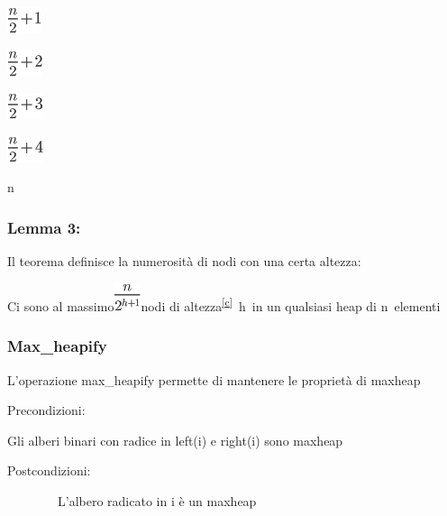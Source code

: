 \documentclass{article}
\begin{document}
\includegraphics{images/image125.png}

\includegraphics{images/image126.png}

\includegraphics{images/image127.png}

\includegraphics{images/image128.png}

{n}

{}

\hypertarget{h.wlc8yrs7inpk}{\subsubsection{\texorpdfstring{{Lemma
3:}}{Lemma 3:}}\label{h.wlc8yrs7inpk}}

{}

{Il teorema definisce la numerosità di nodi con una certa altezza:}

{Ci sono al massimo}\includegraphics{images/image129.png}{nodi di
}{altezza}\textsuperscript{\protect\hyperlink{cmnt3}{{[}c{]}}}{~}{h}{~in
un qualsiasi heap di }{n}{~elementi}

\hypertarget{h.t1rcecigqmbx}{\subsubsection{\texorpdfstring{{Max\_heapify}}{Max\_heapify}}\label{h.t1rcecigqmbx}}

{L'operazione max\_heapify permette di mantenere le proprietà di
maxheap}

{}

{Precondizioni}{:}

{Gli alberi binari con radice in left(i) e right(i) sono maxheap}

{Postcondizioni}{:}

{~~~~~~~~L'albero radicato in i è un maxheap}
\end{document}
